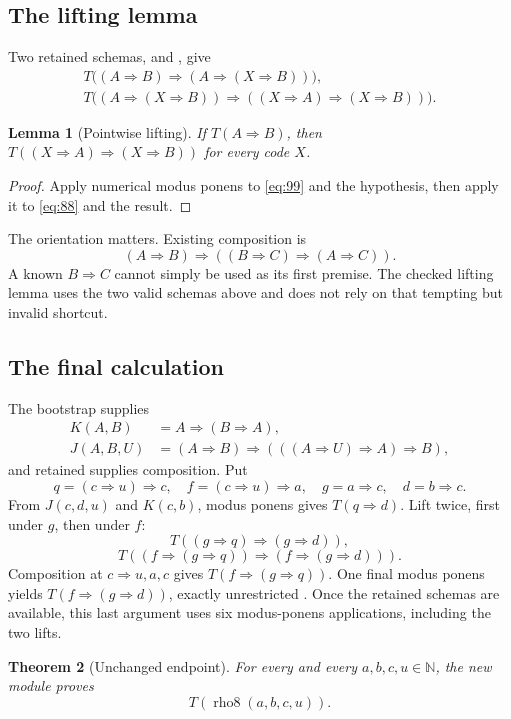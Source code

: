 \documentclass[11pt]{article}
\newtheorem{theorem}{Theorem}[section]\newtheorem{lemma}[theorem]{Lemma}\newtheorem{proposition}[theorem]{Proposition}
\newcommand{\imp}{\mathbin{\Rightarrow}}\newcommand{\Valid}{\operatorname{Valid}}\newcommand{\Sat}{\operatorname{Sat}}\newcommand{\Con}{\operatorname{Con}}\newcommand{\Halt}{\operatorname{Halt}}\newcommand{\PP}{\operatorname{P}}
\newcommand{\code}[1]{\texttt{\detokenize{#1}}}
\begin{document}
\subsection{The lifting lemma}

Two retained schemas, \code{cd99} and \code{cd88}, give
\begin{align}
 T\bigl((A\imp B)\imp(A\imp(X\imp B))\bigr), \label{eq:99}\\
 T\bigl((A\imp(X\imp B))\imp((X\imp A)\imp(X\imp B))\bigr). \label{eq:88}
\end{align}
\begin{lemma}[Pointwise lifting]
If $T(A\imp B)$, then $T((X\imp A)\imp(X\imp B))$ for every code $X$.
\end{lemma}
\begin{proof}
Apply numerical modus ponens to \eqref{eq:99} and the hypothesis, then apply it to \eqref{eq:88} and the result.
\end{proof}

The orientation matters. Existing composition is
\[
 (A\imp B)\imp((B\imp C)\imp(A\imp C)).
\]
A known $B\imp C$ cannot simply be used as its first premise. The checked lifting lemma uses the two valid schemas above and does not rely on that tempting but invalid shortcut.

\subsection{The final calculation}

The bootstrap supplies
\begin{align*}
 K(A,B)&=A\imp(B\imp A),\\
 J(A,B,U)&=(A\imp B)\imp(((A\imp U)\imp A)\imp B),
\end{align*}
and retained \code{cd91} supplies composition. Put
\[
 q=(c\imp u)\imp c,\quad f=(c\imp u)\imp a,\quad
 g=a\imp c,\quad d=b\imp c.
\]
From $J(c,d,u)$ and $K(c,b)$, modus ponens gives $T(q\imp d)$. Lift twice, first under $g$, then under $f$:
\[
 T((g\imp q)\imp(g\imp d)),
\]
\[
 T((f\imp(g\imp q))\imp(f\imp(g\imp d))).
\]
Composition at $c\imp u,a,c$ gives $T(f\imp(g\imp q))$. One final modus ponens yields $T(f\imp(g\imp d))$, exactly unrestricted \code{rho8}. Once the retained schemas are available, this last argument uses six modus-ponens applications, including the two lifts.

\begin{theorem}[Unchanged endpoint]
For every \code{DomImp T} and every $a,b,c,u\in\mathbb N$, the new module proves
\[
 T(\operatorname{rho8}(a,b,c,u)).
\]
\end{theorem}
\end{document}

